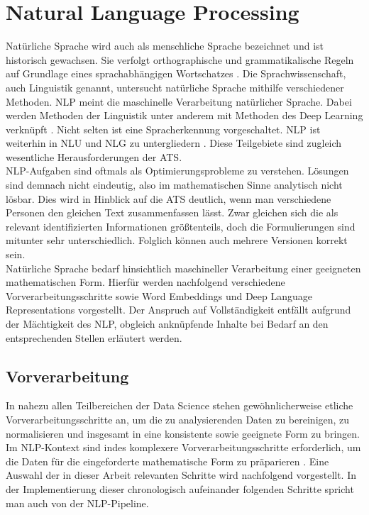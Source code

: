 \chapter{Natural Language Processing}
\thispagestyle{fancy}
\label{chap:Natural Language Processing}

\noindent
Natürliche Sprache wird auch als menschliche Sprache bezeichnet und ist historisch gewachsen. Sie verfolgt orthographische und grammatikalische Regeln auf Grundlage eines sprachabhängigen Wortschatzes \cite[S.~456]{GOO16}. Die Sprachwissenschaft, auch Linguistik genannt, untersucht natürliche Sprache mithilfe verschiedener Methoden. \ac{NLP} meint die maschinelle Verarbeitung natürlicher Sprache. Dabei werden Methoden der Linguistik unter anderem mit Methoden des Deep Learning verknüpft \cite[S.~1]{BIR09}. Nicht selten ist eine Spracherkennung vorgeschaltet. \ac{NLP} ist weiterhin in \ac{NLU} und \ac{NLG} zu untergliedern \cite[S.~27-28]{BIR09}. Diese Teilgebiete sind zugleich wesentliche Herausforderungen der \ac{ATS}.\\

\noindent
\ac{NLP}-Aufgaben sind oftmals als Optimierungsprobleme zu verstehen. Lösungen sind demnach nicht eindeutig, also im mathematischen Sinne analytisch nicht lösbar. Dies wird in Hinblick auf die \ac{ATS} deutlich, wenn man verschiedene Personen den gleichen Text zusammenfassen lässt. Zwar gleichen sich die als relevant identifizierten Informationen größtenteils, doch die Formulierungen sind mitunter sehr unterschiedlich. Folglich können auch mehrere Versionen korrekt sein.\\

\noindent
Natürliche Sprache bedarf hinsichtlich maschineller Verarbeitung einer geeigneten mathematischen Form. Hierfür werden nachfolgend verschiedene Vorverarbeitungsschritte sowie Word Embeddings und Deep Language Representations vorgestellt. Der Anspruch auf Vollständigkeit entfällt aufgrund der Mächtigkeit des \ac{NLP}, obgleich anknüpfende Inhalte bei Bedarf an den entsprechenden Stellen erläutert werden.
\newpage


\section{Vorverarbeitung}
\noindent
In nahezu allen Teilbereichen der Data Science stehen gewöhnlicherweise etliche Vorverarbeitungsschritte an, um die zu analysierenden Daten zu bereinigen, zu normalisieren und insgesamt in eine konsistente sowie geeignete Form zu bringen. Im \ac{NLP}-Kontext sind indes komplexere Vorverarbeitungsschritte erforderlich, um die Daten für die eingeforderte mathematische Form zu präparieren \cite[S.~86]{BIR09}. Eine Auswahl der in dieser Arbeit relevanten Schritte wird nachfolgend vorgestellt. In der Implementierung dieser chronologisch aufeinander folgenden Schritte spricht man auch von der \ac{NLP}-Pipeline.


